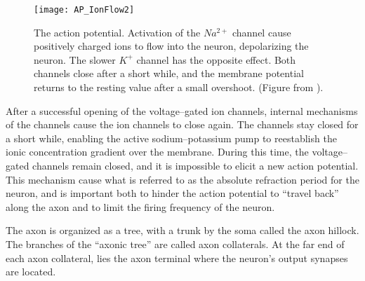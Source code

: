 \begin{figure}[hbt!p]
    \centering
    \texttt{[image: AP\_IonFlow2]}
 	  \caption{The action potential. Activation of the $Na^{2+}$ channel cause positively charged ions to flow into the neuron, depolarizing the neuron. The slower $K^+$ channel has the opposite effect.
				Both channels close after a short while, and the membrane potential returns to the resting value after a small overshoot.
				(Figure from \cite{PrinciplesOfNeuralScience4edKAP09}).
			}
    \label{figActionPotential}
\end{figure}



		After a successful opening of the voltage--gated ion channels, internal mechanisms of the channels cause the ion channels to close again.
		The channels stay closed for a short while, enabling the active sodium--potassium pump to reestablish the ionic concentration gradient over the membrane.
		During this time, the voltage--gated channels remain closed, and it is impossible to elicit a new action potential.
		This mechanism cause what is referred to as the absolute refraction period for the neuron, and is important both to hinder the action potential to ``travel back'' along the axon and to limit the firing frequency of the neuron.
		\cite{NeuroscienceExploringTheBrain3edKAP4} %

		The axon is organized as a tree, with a trunk by the soma called the axon hillock.
		The branches of the ``axonic tree'' are called axon collaterals. %
		At the far end of each axon collateral, lies the axon terminal where the neuron's output synapses are located.
		\cite{NeuroscienceExploringTheBrain3edKAP2}

